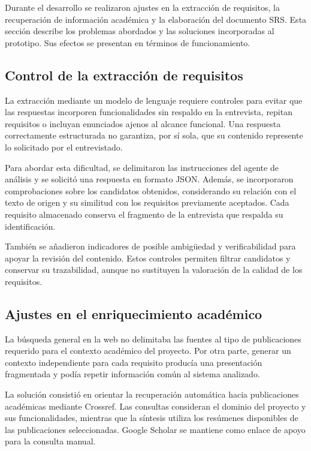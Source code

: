 Durante el desarrollo se realizaron ajustes en la
extracción de requisitos, la recuperación de información
académica y la elaboración del documento SRS.
Esta sección describe los problemas abordados y
las soluciones incorporadas al prototipo. Sus efectos
se presentan en términos de funcionamiento.

\subsection{Control de la extracción de requisitos}

La extracción mediante un modelo de lenguaje requiere
controles para evitar que las respuestas incorporen
funcionalidades sin respaldo en la entrevista,
repitan requisitos o incluyan enunciados ajenos
al alcance funcional. Una respuesta correctamente
estructurada no garantiza, por sí sola, que su contenido
represente lo solicitado por el entrevistado.

Para abordar esta dificultad, se delimitaron las
instrucciones del agente de análisis y se solicitó
una respuesta en formato JSON. Además, se incorporaron
comprobaciones sobre los candidatos obtenidos,
considerando su relación con el texto de origen
y su similitud con los requisitos previamente aceptados.
Cada requisito almacenado conserva el fragmento
de la entrevista que respalda su identificación.

También se añadieron indicadores de posible ambigüedad
y verificabilidad para apoyar la revisión del contenido.
Estos controles permiten filtrar candidatos y conservar
su trazabilidad, aunque no sustituyen la valoración
de la calidad de los requisitos.

\subsection{Ajustes en el enriquecimiento académico}


La búsqueda general en la web no delimitaba las fuentes
al tipo de publicaciones requerido para el contexto
académico del proyecto. Por otra parte, generar un
contexto independiente para cada requisito producía
una presentación fragmentada y podía repetir información
común al sistema analizado.

La solución consistió en orientar la recuperación
automática hacia publicaciones académicas mediante
Crossref. Las consultas consideran el dominio del
proyecto y sus funcionalidades, mientras que la síntesis
utiliza los resúmenes disponibles de las publicaciones
seleccionadas. Google Scholar se mantiene como enlace
de apoyo para la consulta manual.

